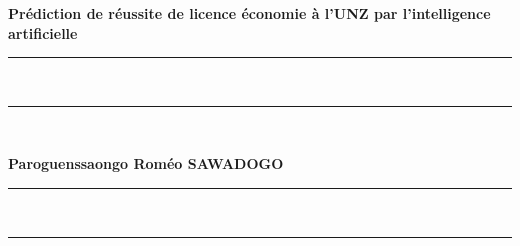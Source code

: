 \newpage
\thispagestyle{empty}
\begin{center}
  \renewcommand*{\familydefault}{\defaultFont}
  \fontsize{12pt}{12pt}\selectfont%
  \textbf{
  Prédiction de réussite de licence économie à l'UNZ par l'intelligence artificielle\\%
  }
\vspace{15pt} {%
  \begin{spacing}{0.05}
    \rule{200pt}{2pt}\\
    \rule{200pt}{0.75pt}\\
  \end{spacing}
  \renewcommand*{\familydefault}{\defaultFont}
  \fontsize{14pt}{14pt}\selectfont%
  \vspace{15pt}
  \textbf{Paroguenssaongo Roméo SAWADOGO}
  \vspace{8pt}
  \begin{spacing}{0.05}
    \rule{200pt}{0.75pt}\\
    \rule{200pt}{2pt}\\
  \end{spacing}
}
\end{center}


